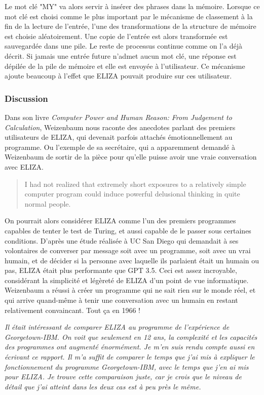 \documentclass[11pt,a4paper]{report}
\begin{document}
  Le mot clé "MY" va alors servir à insérer des phrases dans la mémoire. Lorsque ce mot clé 
  est choisi comme le plus important par le mécanisme de classement à la fin de la lecture 
  de l'entrée, l'une des transformations de la structure de mémoire est choisie aléatoirement. 
  Une copie de l'entrée est alors transformée est sauvegardée dans une pile. Le reste de processus 
  continue comme on l'a déjà décrit. Si jamais une entrée future n'admet aucun mot clé, une réponse 
  est dépilée de la pile de mémoire et elle est envoyée à l'utilisateur. Ce mécanisme ajoute 
  beaucoup à l'effet que ELIZA pouvait produire sur ces utilisateur. 

      \subsubsection*{Discussion}
Dans son livre \textit{Computer Power and Human Reason: From Judgement to Calculation}, 
Weizenbaum nous raconte des anecdotes parlant des premiers utilisateurs de ELIZA, 
qui devenait parfois attachés émotionnellement au programme. Ou l'exemple de sa 
secrétaire, qui a apparemment demandé à Weizenbaum de sortir de la pièce pour qu'elle 
puisse avoir une vraie conversation avec ELIZA.  

\begin{quote}
  I had not realized that extremely short exposures to a relatively simple computer program could 
  induce powerful delusional thinking in quite normal people.
\end{quote}

On pourrait alors considérer ELIZA comme l'un des premiers programmes capables de tenter 
le test de Turing, et aussi capable de le passer sous certaines conditions. 
D'après une étude réalisée à UC San Diego qui demandait à ses volontaires de converser 
par message soit avec un programme, soit avec un vrai humain, et de décider si la personne 
avec laquelle ils parlaient était un humain ou pas, ELIZA était plus performante que GPT 3.5. 
Ceci est assez incroyable, considérant la simplicité et légèreté de ELIZA d'un point de vue 
informatique. Weizenbaum a réussi à créer un programme qui ne sait rien sur le monde réel, 
et qui arrive quand-même à tenir une conversation avec un humain en restant relativement 
convaincant. Tout ça en 1966 ! 

\textit{Il était intéressant de comparer ELIZA au programme de l'expérience de Georgetown-IBM. 
On voit que seulement en 12 ans, la complexité et les capacités des programmes ont augmenté 
énormément. Je m'en suis rendu compte aussi en écrivant ce rapport. Il m'a suffit de comparer 
le temps que j'ai mis à expliquer le fonctionnement du programme Georgetown-IBM, avec le temps 
que j'en ai mis pour ELIZA. Je trouve cette comparaison juste, car je crois que le niveau de 
détail que j'ai atteint dans les deux cas est à peu près le même. }
\end{document}
